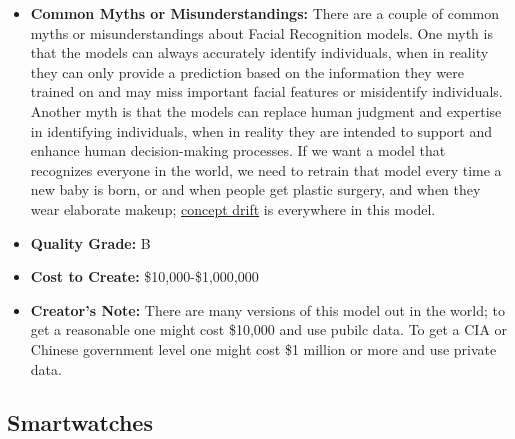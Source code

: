 \begin{itemize}
    \item \textbf{Common Myths or Misunderstandings:} There are a couple of common myths or misunderstandings about Facial Recognition models. One myth is that the models can always accurately identify individuals, when in reality they can only provide a prediction based on the information they were trained on and may miss important facial features or misidentify individuals. Another myth is that the models can replace human judgment and expertise in identifying individuals, when in reality they are intended to support and enhance human decision-making processes. If we want a model that recognizes everyone in the world, we need to retrain that model every time a new baby is born, or and when people get plastic surgery, and when they wear elaborate makeup; \hyperref[sec:drift]{concept drift} is everywhere in this model.  
    \item \textbf{Quality Grade:} B
    \item \textbf{Cost to Create:} \$10,000-\$1,000,000
    \item \textbf{Creator's Note:} There are many versions of this model out in the world; to get a reasonable one might cost \$10,000 and use pubilc data. To get a CIA or Chinese government level one might cost \$1 million or more and use private data. 
\end{itemize}

\subsection{Smartwatches} 

